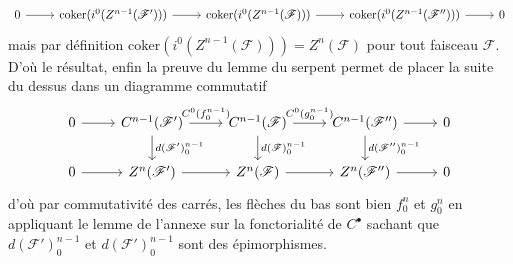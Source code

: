 \documentclass[a4paper,12pt]{article}
\newcommand{\F}{\mathscr F}
\newcommand{\coker}{\textrm{coker}}
\theoremstyle{plain}
\theoremstyle{definition}
\theoremstyle{remark}
\begin{document}
\[\begin{tikzcd}
	0 & {\coker(i^0(Z^{n-1}(\F')))} & {\coker(i^0(Z^{n-1}(\F)))} & {\coker(i^0(Z^{n-1}(\F'')))} & 0
	\arrow[from=1-1, to=1-2]
	\arrow[from=1-2, to=1-3]
	\arrow[from=1-3, to=1-4]
	\arrow[from=1-4, to=1-5]
\end{tikzcd}\]
mais par définition $\coker(i^0(Z^{n-1}(\F)))=Z^n(\F)$ pour tout 
faisceau $\F$. D'où le résultat, enfin la preuve du lemme du serpent
permet de placer la suite du dessus dans un diagramme commutatif
\[\begin{tikzcd}
	0 & {C^{n-1}(\F')} & {C^{n-1}(\F)} & {C^{n-1}(\F'')} & 0 \\
	0 & {Z^{n}(\F')} & {Z^{n}(\F)} & {Z^{n}(\F'')} & 0
	\arrow[from=1-1, to=1-2]
	\arrow["{C^0(f_0^{n-1})}", from=1-2, to=1-3]
	\arrow["d(\F')_0^{n-1}",from=1-2, to=2-2]
	\arrow["{C^0(g_0^{n-1})}", from=1-3, to=1-4]
	\arrow["d(\F)_0^{n-1}",from=1-3, to=2-3]
	\arrow[from=1-4, to=1-5]
	\arrow["d(\F'')_0^{n-1}",from=1-4, to=2-4]
	\arrow[from=2-1, to=2-2]
	\arrow[from=2-2, to=2-3]
	\arrow[from=2-3, to=2-4]
	\arrow[from=2-4, to=2-5]
\end{tikzcd}\]
d'où par commutativité des carrés, les flèches du bas sont bien 
$f_0^n$ et $g_0^n$ en appliquant le lemme de l'annexe sur la 
fonctorialité de $C^\bullet$ sachant que $d(\F')_0^{n-1}$ et 
$d(\F')_0^{n-1}$ sont des épimorphismes.
\newline
\end{document}
